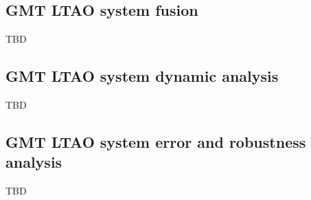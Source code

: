 
\subsection{GMT LTAO system fusion}
\label{subsec:ltao-system-fusion}

TBD

\subsection{GMT LTAO system dynamic analysis}
\label{subsec:ltao-dynamics}

TBD

\subsection{GMT LTAO system error and robustness analysis}
\label{subsec:ltao-errors}

TBD